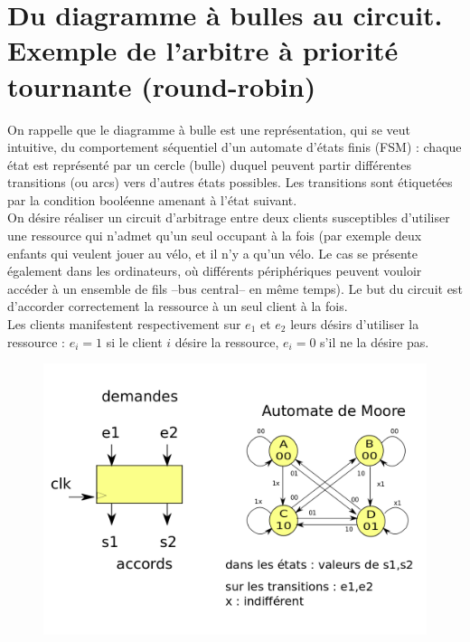 \documentclass[a4paper,11pt]{article}
\begin{document}
\section{Du diagramme à bulles au circuit. Exemple de l'arbitre à priorité tournante (round-robin)}
On rappelle que le diagramme à bulle est une représentation, qui se veut intuitive, du comportement séquentiel d'un automate d'états finis (FSM) : chaque état est représenté par un cercle
(bulle) duquel peuvent partir différentes transitions (ou arcs) vers d'autres états possibles. Les transitions sont étiquetées par la condition booléenne amenant à l'état suivant.\\

On désire réaliser un circuit d'arbitrage entre deux clients susceptibles d'utiliser une ressource qui n'admet qu'un seul occupant à la fois (par exemple deux enfants qui veulent jouer au vélo,
et il n'y a qu'un vélo. Le cas se présente également dans les ordinateurs, où différents périphériques peuvent vouloir accéder à un ensemble de fils --bus central-- en même temps).
Le but du circuit est d'accorder correctement la ressource à un seul client à la fois.\\

Les clients manifestent respectivement sur $e_1$ et $e_2$ leurs désirs d'utiliser la ressource : $e_i=1$ si le client $i$ désire la ressource, $e_i=0$ s'il ne la désire pas.\\

\begin{figure}[!h]
\begin{center}
\includegraphics[scale=0.3]{./arbitre.png}
\end{center}
\end{figure}
\end{document}

